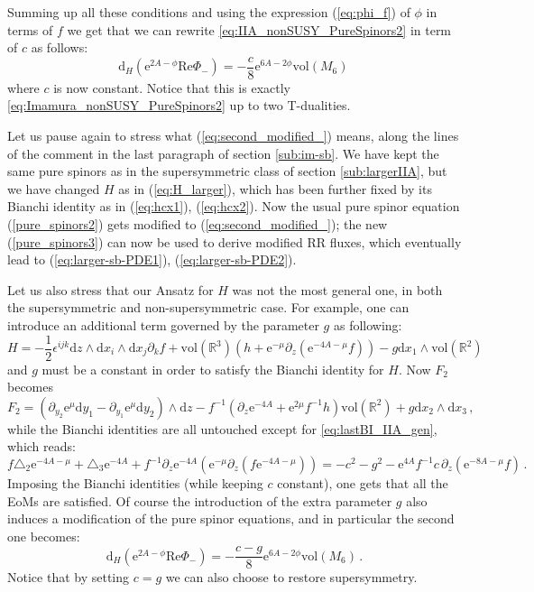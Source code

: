 \documentclass[12pt]{article}
\newcommand{\R}{\mathbb{R}}
\renewcommand{\Re}{\mathrm{Re}}
\newcommand{\dd}{\mathrm{d}}
\newcommand{\e}{\mathrm{e}}
\newcommand{\vol}{\mathrm{vol}}
\begin{document}
Summing up all these conditions and using the expression (\ref{eq:phi_f}) of $\phi$ in terms of $f$ we get that we can rewrite \eqref{eq:IIA_nonSUSY_PureSpinors2} in term of $c$ as follows:
\begin{equation}
\label{eq:second_modified_}
\dd_H( \e^{2A-\phi} \Re\Phi_-) = -\frac{c}{8} \e^{6A-2 \phi} \vol(M_6) \, 
\end{equation}
where $c$ is now constant. Notice that this is exactly \eqref{eq:Imamura_nonSUSY_PureSpinors2} up to two T-dualities.

Let us pause again to stress what (\ref{eq:second_modified_}) means, along the lines of the comment in the last paragraph of section \ref{sub:im-sb}. We have kept the same pure spinors as in the supersymmetric class of section \ref{sub:largerIIA}, but we have changed $H$ as in (\ref{eq:H_larger}), which has been further fixed by its Bianchi identity as in (\ref{eq:hcx1}), (\ref{eq:hcx2}). Now the usual pure spinor equation (\ref{pure_spinors2}) gets modified to (\ref{eq:second_modified_}); the new (\ref{pure_spinors3}) can now be used to derive modified RR fluxes, which eventually lead to (\ref{eq:larger-sb-PDE1}), (\ref{eq:larger-sb-PDE2}).


Let us also stress that our Ansatz for $H$ was not the most general one, in both the supersymmetric and non-supersymmetric case. For example, one can introduce an additional term governed by the parameter $g$ as following:
\begin{equation}
\label{eq:H_eq_mod}
H= - \frac{1}{2} \epsilon^{ijk} \dd z \wedge \dd x_i \wedge \dd x_j \partial_k f + \vol(\R^3) (h+\e^{-\mu}  \partial_z (\e^{-4A-\mu} f))-g \dd x_1 \wedge \vol (\R^2) 
\end{equation}
and $g$ must be a constant in order to satisfy the Bianchi identity for $H$. Now $F_2$ becomes
\begin{equation}
F_2 = \left( \partial_{y_2}\e^{\mu} \dd y_1 -\partial_{y_1}\e^{\mu} \dd y_2 \right) \wedge \dd z - f^{-1}\left( \partial_z \e^{-4A} + \e^{2 \mu} f^{-1} h \right) \vol(\R^2) + g \dd x_2 \wedge \dd x_3 \, ,
\end{equation}
while the Bianchi identities are all untouched except for \eqref{eq:lastBI_IIA_gen}, which reads:
\begin{equation}
f \triangle_2 \e^{-4A-\mu} + \triangle_3 \e^{-4A} + f^{-1} \partial_{z}\e^{-4A}  \left(\e^{-\mu} \partial_{z} (f \e^{-4A-\mu}) \right) = -c^2- g^2 - \e^{4A} f^{-1} c \,\partial_{z} \left(\e^{-8A-\mu} f\right)  \, .
\end{equation}
Imposing the Bianchi identities (while keeping $c$ constant), one gets that all the EoMs are satisfied. Of course the introduction of the extra parameter $g$ also induces a modification of the pure spinor equations, and in particular the second one becomes:
\begin{equation}
\label{eq:second_pure_spinor_mod}
\dd_H( \e^{2A-\phi} \Re\Phi_-) = -\frac{c-g}{8} \e^{6A-2 \phi} \vol(M_6) \, .
\end{equation}
Notice that by setting $c=g$ we can also choose to restore supersymmetry.
\end{document}
